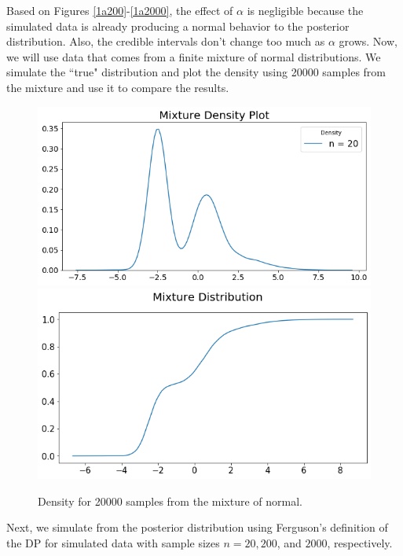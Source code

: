 \documentclass[a4paper, 10pt]{article}
\begin{document}
\begin{enumerate}
    Based on Figures \ref{1a200}-\ref{1a2000}, the effect of $\alpha$ is negligible because the simulated data is already producing a normal behavior to the posterior distribution. Also, the credible intervals don't change too much as $\alpha$ grows.
    \clearpage
    Now, we will use data that comes from a finite mixture of normal distributions. We simulate the ``true" distribution and plot the density using 20000 samples from the mixture and use it to compare the results.
    \begin{figure}[h!]
        \centering
        \includegraphics[scale = 0.37]{hw1b_truedens.png}\includegraphics[scale=0.37]{hw1b_truedistr.png}
        \caption{Density for 20000 samples from the mixture of normal.}
        \label{nmix_dist}
    \end{figure}
    
    Next, we simulate from the posterior distribution using Ferguson's definition of the DP for simulated data with sample sizes $n=20, 200$, and $2000$, respectively.
    

\end{enumerate}
\end{document}
